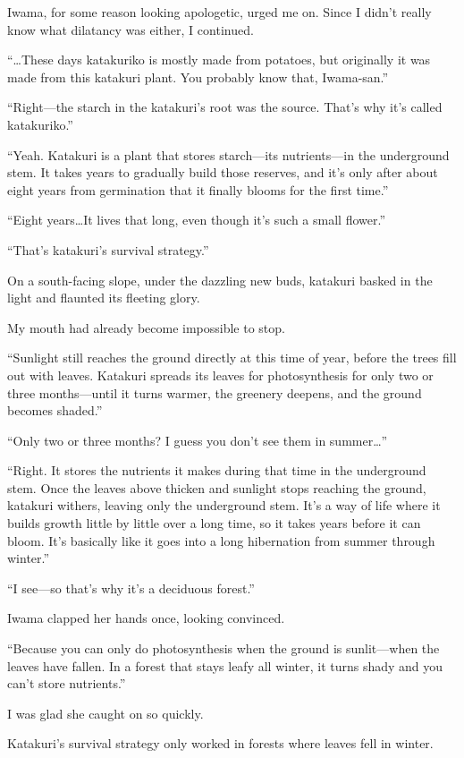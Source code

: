\documentclass[
    a4paper,
    12pt,
    twoside,
    openany,
    UTF8,
    fontset=windows
]{ctexbook}
\begin{document}
Iwama, for some reason looking apologetic, urged me on. Since I didn't really know what dilatancy was either, I continued.

``\dots These days katakuriko is mostly made from potatoes, but originally it was made from this katakuri plant. You probably know that, Iwama-san.''

``Right---the starch in the katakuri's root was the source. That's why it's called katakuriko.''

``Yeah. Katakuri is a plant that stores starch---its nutrients---in the underground stem. It takes years to gradually build those reserves, and it's only after about eight years from germination that it finally blooms for the first time.''

``Eight years\dots It lives that long, even though it's such a small flower.''

``That's katakuri's survival strategy.''

On a south-facing slope, under the dazzling new buds, katakuri basked in the light and flaunted its fleeting glory.

My mouth had already become impossible to stop.

``Sunlight still reaches the ground directly at this time of year, before the trees fill out with leaves. Katakuri spreads its leaves for photosynthesis for only two or three months---until it turns warmer, the greenery deepens, and the ground becomes shaded.''

``Only two or three months? I guess you don't see them in summer\dots''

``Right. It stores the nutrients it makes during that time in the underground stem. Once the leaves above thicken and sunlight stops reaching the ground, katakuri withers, leaving only the underground stem. It's a way of life where it builds growth little by little over a long time, so it takes years before it can bloom. It's basically like it goes into a long hibernation from summer through winter.''

``I see---so that's why it's a deciduous forest.''

Iwama clapped her hands once, looking convinced.

``Because you can only do photosynthesis when the ground is sunlit---when the leaves have fallen. In a forest that stays leafy all winter, it turns shady and you can't store nutrients.''

I was glad she caught on so quickly.

Katakuri's survival strategy only worked in forests where leaves fell in winter.
\end{document}
